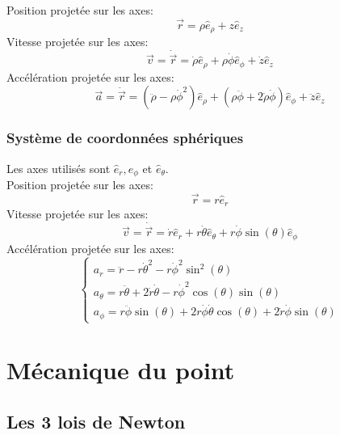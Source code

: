 \documentclass{article}
\numberwithin{equation}{section}
\begin{document}
Position projetée sur les axes:
\begin{equation}
	\boxed{\vec r = \rho \hat e_\rho + z \hat e_z}
\end{equation}
Vitesse projetée sur les axes:
\begin{equation}
	\boxed{\vec v = \dot{\vec{r}} = \dot \rho \hat e_\rho + \rho \dot \phi \hat e_\phi + \dot z \hat e_z}
\end{equation}
Accélération projetée sur les axes:
\begin{equation}
	\boxed{\vec a = \ddot{\vec{r}}	= \left (\ddot \rho - \rho \dot \phi^2 \right ) \hat e_\rho
					 						+ \left (\rho \ddot \phi + 2 \dot \rho \dot \phi \right ) \hat e_\phi
					 						+ \ddot z \hat e_z}
\end{equation}

\subsubsection{Système de coordonnées sphériques}
Les axes utilisés sont \(\hat e_r, \hat e_\phi\) et \(\hat e_\theta\). \\
Position projetée sur les axes:
\begin{equation}
	\boxed{\vec r = r \hat e_r}
\end{equation}
Vitesse projetée sur les axes:
\begin{equation}
	\boxed{\vec v = \dot{\vec r} = \dot r \hat e_r + r \dot \theta \hat e_\theta + r \dot \phi \sin(\theta) \hat e_\phi}
\end{equation}
Accélération projetée sur les axes:
\begin{equation}
	\boxed{\begin{cases}
	a_r 		= \ddot r - r \dot \theta^2 - r \dot \phi^2 \sin^2(\theta) \\
	a_\theta	= r \ddot \theta + 2 \dot r \dot \theta - r \dot \phi^2 \cos(\theta)\sin(\theta) \\
	a_\phi		= r \ddot \phi \sin(\theta) + 2r \dot \phi \dot \theta \cos(\theta) + 2 \dot r \dot \phi \sin(\theta)
	\end{cases}}
\end{equation}

\section{Mécanique du point}

\subsection{Les 3 lois de Newton}
\end{document}
